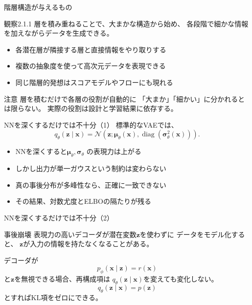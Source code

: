 \begin{frame}{階層構造が与えるもの}
    \begin{block}{観察2.1.1}
        層を積み重ねることで、大まかな構造から始め、
        各段階で細かな情報を加えながらデータを生成できる。
    \end{block}
    \begin{itemize}
        \item 各潜在層が隣接する層と直接情報をやり取りする
        \item 複数の抽象度を使って高次元データを表現できる
        \item 同じ階層的発想はスコアモデルやフローにも現れる
    \end{itemize}
    \begin{alertblock}{注意}
        層を積むだけで各層の役割が自動的に
        「大まか」「細かい」に分かれるとは限らない。
        実際の役割は設計と学習結果に依存する。
    \end{alertblock}
\end{frame}
\begin{frame}{NNを深くするだけでは不十分（1）}
    標準的なVAEでは、
    \[
        q_\theta(\boldsymbol{z}\mid\boldsymbol{x})
        =
        \mathcal{N}\!\left(
        \boldsymbol{z};
        \boldsymbol{\mu}_\theta(\boldsymbol{x}),
        \operatorname{diag}
        (\boldsymbol{\sigma}_\theta^2(\boldsymbol{x}))
        \right).
    \]
    \begin{itemize}
        \item NNを深くすると$\boldsymbol{\mu}_\theta,\boldsymbol{\sigma}_\theta$
        の表現力は上がる
        \item しかし出力が単一ガウスという制約は変わらない
        \item 真の事後分布が多峰性なら、正確に一致できない
        \item その結果、対数尤度とELBOの隔たりが残る
    \end{itemize}
\end{frame}
\begin{frame}{NNを深くするだけでは不十分（2）}
    \begin{alertblock}{事後崩壊}
        表現力の高いデコーダが潜在変数$\boldsymbol{z}$を使わずに
        データをモデル化すると、
        $\boldsymbol{z}$が入力の情報を持たなくなることがある。
    \end{alertblock}
    デコーダが
    \[
        p_\phi(\boldsymbol{x}\mid\boldsymbol{z})=r(\boldsymbol{x})
    \]
    と$\boldsymbol{z}$を無視できる場合、再構成項は
    $q_\theta(\boldsymbol{z}\mid\boldsymbol{x})$を変えても変化しない。
    \[
        q_\theta(\boldsymbol{z}\mid\boldsymbol{x})=p(\boldsymbol{z})
    \]
    とすればKL項をゼロにできる。
\end{frame}

